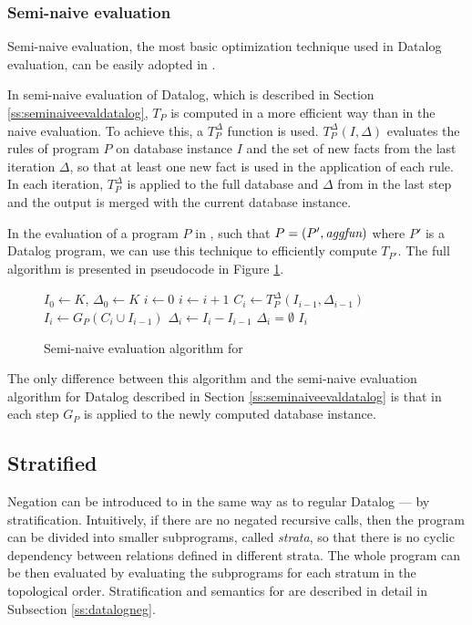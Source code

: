 \subsubsection{Semi-naive evaluation} Semi-naive evaluation, the most basic optimization technique used in Datalog evaluation, can be easily adopted in \datalogra.

In semi-naive evaluation of Datalog, which is described in Section \ref{ss:seminaiveevaldatalog}, $T_P$ is computed in a more efficient way than in the naive evaluation. To achieve this, a $T^\Delta_P$ function is used. $T_P^\Delta(I, \Delta)$ evaluates the rules of program $P$ on database instance $I$ and the set of new facts from the last iteration $\Delta$, so that at least one new fact is used in the application of each rule. In each iteration, $T^\Delta_P$ is applied to the full database and $\Delta$ from in the last step and the output is merged with the current database instance.

In the evaluation of a program $P$ in \datalogra, such that $P = (P', \textit{aggfun})$ where $P'$ is a Datalog program, we can use this technique to efficiently compute $T_{P'}$. The full algorithm is presented in pseudocode in Figure \ref{psc:seminaiveevaldatalogra}.

\begin{figure}[!htbp]
\begin{codebox}
  \li $I_0 \leftarrow K$, $\Delta_0 \leftarrow K$
  \li $i \leftarrow 0$
  \li \Repeat
	\li $i \leftarrow i + 1$
	\li $C_i \leftarrow T_P^\Delta(I_{i-1}, \Delta_{i-1})$
	\li $I_i \leftarrow G_P(C_i \cup I_{i-1})$
	\li $\Delta_i \leftarrow I_i - I_{i-1}$
  \li \Until $\Delta_i = \emptyset$
  \li \Return $I_i$
\end{codebox}
\caption{Semi-naive evaluation algorithm for \datalogra}\label{psc:seminaiveevaldatalogra}
\end{figure}


The only difference between this algorithm and the semi-naive evaluation algorithm for Datalog described in Section \ref{ss:seminaiveevaldatalog} is that in each step $G_P$ is applied to the newly computed database instance.

\subsection{Stratified \datalogra}
Negation can be introduced to \datalogra in the same way as to regular Datalog --- by stratification. Intuitively, if there are no negated recursive calls, then the program can be divided into smaller subprograms, called \emph{strata}, so that there is no cyclic dependency between relations defined in different strata. The whole program can be then evaluated by evaluating the subprograms for each stratum in the topological order. Stratification and semantics for \datalogneg are described in detail in Subsection \ref{ss:datalogneg}.

